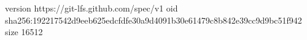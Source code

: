 version https://git-lfs.github.com/spec/v1
oid sha256:192217542d9eeb625edcfdfe30a9d4091b30e61479c8b842e39cc9d9bc51f942
size 16512
